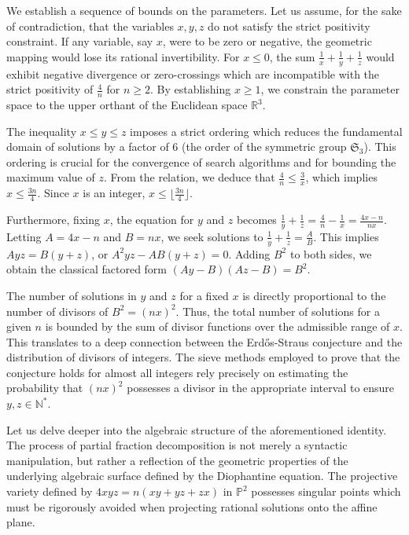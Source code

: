 \documentclass[12pt, a4paper]{article}
\theoremstyle{definition}
\theoremstyle{remark}
\begin{document}
We establish a sequence of bounds on the parameters. Let us assume, for the sake of contradiction, that the variables $x, y, z$ do not satisfy the strict positivity constraint. If any variable, say $x$, were to be zero or negative, the geometric mapping would lose its rational invertibility. For $x \le 0$, the sum $\frac{1}{x} + \frac{1}{y} + \frac{1}{z}$ would exhibit negative divergence or zero-crossings which are incompatible with the strict positivity of $\frac{4}{n}$ for $n \ge 2$. By establishing $x \ge 1$, we constrain the parameter space to the upper orthant of the Euclidean space $\mathbb{R}^3$.

The inequality $x \le y \le z$ imposes a strict ordering which reduces the fundamental domain of solutions by a factor of 6 (the order of the symmetric group $\mathfrak{S}_3$). This ordering is crucial for the convergence of search algorithms and for bounding the maximum value of $z$. From the relation, we deduce that $\frac{4}{n} \le \frac{3}{x}$, which implies $x \le \frac{3n}{4}$. Since $x$ is an integer, $x \le \lfloor \frac{3n}{4} \rfloor$.

Furthermore, fixing $x$, the equation for $y$ and $z$ becomes $\frac{1}{y} + \frac{1}{z} = \frac{4}{n} - \frac{1}{x} = \frac{4x - n}{nx}$. Letting $A = 4x - n$ and $B = nx$, we seek solutions to $\frac{1}{y} + \frac{1}{z} = \frac{A}{B}$. This implies $Ayz = B(y+z)$, or $A^2 y z - AB(y+z) = 0$. Adding $B^2$ to both sides, we obtain the classical factored form $(Ay - B)(Az - B) = B^2$.

The number of solutions in $y$ and $z$ for a fixed $x$ is directly proportional to the number of divisors of $B^2 = (nx)^2$. Thus, the total number of solutions for a given $n$ is bounded by the sum of divisor functions over the admissible range of $x$. This translates to a deep connection between the Erd\H{o}s-Straus conjecture and the distribution of divisors of integers. The sieve methods employed to prove that the conjecture holds for almost all integers rely precisely on estimating the probability that $(nx)^2$ possesses a divisor in the appropriate interval to ensure $y, z \in \mathbb{N}^*$.

Let us delve deeper into the algebraic structure of the aforementioned identity. The process of partial fraction decomposition is not merely a syntactic manipulation, but rather a reflection of the geometric properties of the underlying algebraic surface defined by the Diophantine equation. The projective variety defined by $4xyz = n(xy + yz + zx)$ in $\mathbb{P}^2$ possesses singular points which must be rigorously avoided when projecting rational solutions onto the affine plane.
\end{document}
